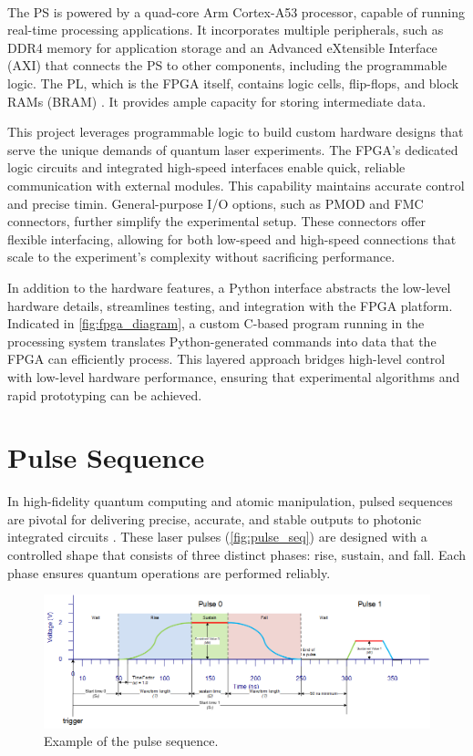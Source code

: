 The PS is powered by a quad-core Arm\textsuperscript{\textregistered} Cortex\textsuperscript{\textregistered}-A53 processor, capable of running real-time processing applications. It incorporates multiple peripherals, such as DDR4 memory for application storage and an Advanced eXtensible Interface (AXI) that connects the PS to other components, including the programmable logic. The PL, which is the FPGA itself, contains logic cells, flip-flops, and block RAMs (BRAM) \cite{XilinxUG1182}. It provides ample capacity for storing intermediate data.

This project leverages programmable logic to build custom hardware designs that serve the unique demands of quantum laser experiments. The FPGA's dedicated logic circuits and integrated high-speed interfaces enable quick, reliable communication with external modules. This capability maintains accurate control and precise timin. General-purpose I/O options, such as PMOD and FMC connectors, further simplify the experimental setup. These connectors offer flexible interfacing, allowing for both low-speed and high-speed connections that scale to the experiment's complexity without sacrificing performance.

In addition to the hardware features, a Python interface abstracts the low-level hardware details, streamlines testing, and integration with the FPGA platform. Indicated in \autoref{fig:fpga_diagram}, a custom C-based program running in the processing system translates Python-generated commands into data that the FPGA can efficiently process. This layered approach bridges high-level control with low-level hardware performance, ensuring that experimental algorithms and rapid prototyping can be achieved.

\section{Pulse Sequence}\label{sec:hw_pulse}

In high-fidelity quantum computing and atomic manipulation, pulsed sequences are pivotal for delivering precise, accurate, and stable outputs to photonic integrated circuits \cite{apic}. These laser pulses (\autoref{fig:pulse_seq}) are designed with a controlled shape that consists of three distinct phases: rise, sustain, and fall. Each phase ensures quantum operations are performed reliably.

\begin{figure}[h]
    \centering
    \includegraphics[width=1\linewidth]{figures/2.1.png}
    \caption{Example of the pulse sequence.}
    \label{fig:pulse_seq}
\end{figure}

